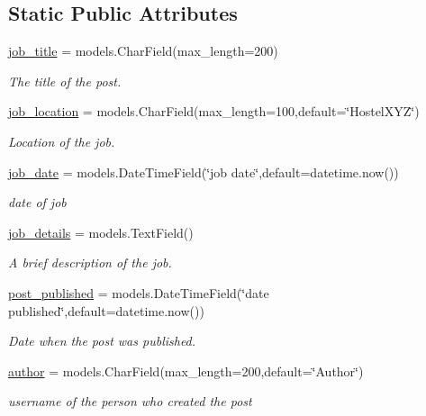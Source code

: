\subsection*{Static Public Attributes}
\begin{DoxyCompactItemize}
\item 
\hyperlink{classmain_1_1models_1_1Posts_aff937f03c1b067fa1dbc22fe0a4f141c}{job\+\_\+title} = models.\+Char\+Field(max\+\_\+length=200)
\begin{DoxyCompactList}\small\item\em The title of the post. \end{DoxyCompactList}\item 
\hyperlink{classmain_1_1models_1_1Posts_a6a7cef4a2cff2cb38557a346b1b9cc9e}{job\+\_\+location} = models.\+Char\+Field(max\+\_\+length=100,default=\char`\"{}Hostel\+X\+YZ\char`\"{})
\begin{DoxyCompactList}\small\item\em Location of the job. \end{DoxyCompactList}\item 
\hyperlink{classmain_1_1models_1_1Posts_a8d5fd2451a74cbef923c841192627ee4}{job\+\_\+date} = models.\+Date\+Time\+Field(\char`\"{}job date\char`\"{},default=datetime.\+now())
\begin{DoxyCompactList}\small\item\em date of job \end{DoxyCompactList}\item 
\hyperlink{classmain_1_1models_1_1Posts_a01fb86493104e3ed82c25b011b4768a7}{job\+\_\+details} = models.\+Text\+Field()
\begin{DoxyCompactList}\small\item\em A brief description of the job. \end{DoxyCompactList}\item 
\hyperlink{classmain_1_1models_1_1Posts_a6e0e50f0ed5e44dc5b275de570745348}{post\+\_\+published} = models.\+Date\+Time\+Field(\char`\"{}date published\char`\"{},default=datetime.\+now())
\begin{DoxyCompactList}\small\item\em Date when the post was published. \end{DoxyCompactList}\item 
\hyperlink{classmain_1_1models_1_1Posts_ab030c90138407de66474824c18a2ef28}{author} = models.\+Char\+Field(max\+\_\+length=200,default=\char`\"{}Author\char`\"{})
\begin{DoxyCompactList}\small\item\em username of the person who created the post \end{DoxyCompactList}\end{DoxyCompactItemize}



